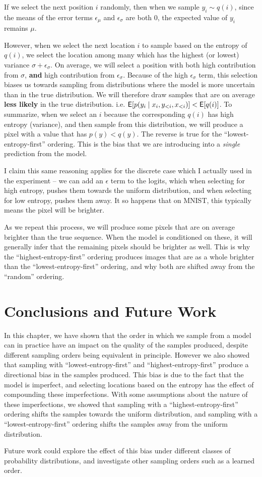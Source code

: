 If we select the next position $i$ randomly, then when we sample $y_i \sim q(i)$, since the means of the error terms $\epsilon_\mu$ and $\epsilon_\sigma$ are both 0, the expected value of $y_i$ remains $\mu$.

However, when we select the next location $i$ to sample based on the entropy of $q(i)$, we select the location among many which has the highest (or lowest) variance $\sigma + \epsilon_\sigma$. On average, we will select a position with both high contribution from $\sigma$, \textbf{and} high contribution  from $\epsilon_\sigma$. Because of the high $\epsilon_\sigma$ term, this selection biases us towards sampling from distributions where the model is more uncertain than in the true distribution. We will therefore draw samples that are on average \textbf{less likely} in the true distribution. i.e. $\mathsf{E}[p(y_i \mid x_i, y_{<i}, x_{<i})] < \mathsf{E}[q(i)]$. To summarize, when we select an $i$ because the corresponding $q(i)$ has high entropy (variance), and then sample from this distribution, we will produce a pixel with a value that has $p(y) < q(y)$. The reverse is true for the ``lowest-entropy-first'' ordering. This is the bias that we are introducing into a \textit{single} prediction from the model.

I claim this same reasoning applies for the discrete case which I actually used in the experiment -- we can add an $\epsilon$ term to the logits, which when selecting for high entropy, pushes them towards the uniform distribution, and when selecting for low entropy, pushes them away. It so happens that on MNIST, this typically means the pixel will be brighter.

As we repeat this process, we will produce some pixels that are on average brighter than the true sequence. When the model is conditioned on these, it will generally infer that the remaining pixels should be brighter as well. This is why the ``highest-entropy-first'' ordering produces images that are as a whole brighter than the ``lowest-entropy-first'' ordering, and why both are shifted away from the ``random'' ordering.

\section{Conclusions and Future Work}
\label{s:a-o-conclusions}

In this chapter, we have shown that the order in which we sample from a model can in practice have an impact on the quality of the samples produced, despite different sampling orders being equivalent in principle. However we also showed that sampling with ``lowest-entropy-first'' and ``highest-entropy-first'' produce a directional bias in the samples produced. This bias is due to the fact that the model is imperfect, and selecting locations based on the entropy has the effect of compounding these imperfections. With some assumptions about the nature of these imperfections, we showed that sampling with a ``highest-entropy-first'' ordering shifts the samples towards the uniform distribution, and sampling with a ``lowest-entropy-first'' ordering shifts the samples away from the uniform distribution.

Future work could explore the effect of this bias under different classes of probability distributions, and investigate other sampling orders such as a learned order.
